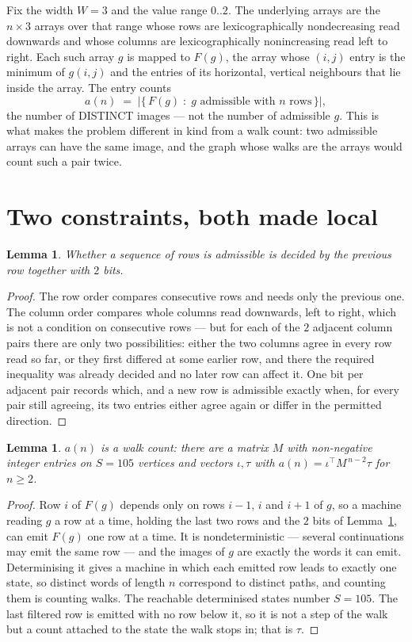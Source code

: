 \documentclass[11pt,a4paper]{article}
\theoremstyle{plain}
\newtheorem{lemma}[theorem]{Lemma}
\theoremstyle{definition}
\begin{document}
Fix the width $W=3$ and the value range $0..2$. The underlying arrays are the
$n\times3$ arrays over that range whose rows are lexicographically nondecreasing read downwards
and whose columns are lexicographically nonincreasing read left to right. Each such array $g$
is mapped to $F(g)$, the array whose $(i,j)$ entry is the minimum of $g(i,j)$ and the entries
of its horizontal, vertical neighbours that lie inside the array. The entry counts
\[
a(n)\;=\;\bigl|\{\,F(g)\;:\;g\text{ admissible with }n\text{ rows}\,\}\bigr|,
\]
the number of DISTINCT images --- not the number of admissible $g$. This is what makes the
problem different in kind from a walk count: two admissible arrays can have the same image, and
the graph whose walks are the arrays would count such a pair twice.

\section{Two constraints, both made local}

\begin{lemma}\label{lem:local}
Whether a sequence of rows is admissible is decided by the previous row together with
$2$ bits.
\end{lemma}

\begin{proof}
The row order compares consecutive rows and needs only the previous one. The column order
compares whole columns read downwards, left to right, which is not a condition on consecutive
rows --- but for each of the $2$ adjacent column pairs there are only two possibilities:
either the two columns agree in every row read so far, or they first differed at some earlier
row, and there the required inequality was already decided and no later row can affect it. One
bit per adjacent pair records which, and a new row is admissible exactly when, for every pair
still agreeing, its two entries either agree again or differ in the permitted direction.
\end{proof}

\begin{lemma}\label{lem:det}
$a(n)$ is a walk count: there are a matrix $M$ with non-negative integer entries on $S=105$
vertices and vectors $\iota,\tau$ with $a(n)=\iota^{\!\top}M^{\,n-2}\tau$ for $n\ge2$.
\end{lemma}

\begin{proof}
Row $i$ of $F(g)$ depends only on rows $i-1$, $i$ and $i+1$ of $g$, so a machine reading $g$ a
row at a time, holding the last two rows and the $2$ bits of Lemma~\ref{lem:local}, can
emit $F(g)$ one row at a time. It is nondeterministic --- several continuations may emit the
same row --- and the images of $g$ are exactly the words it can emit. Determinising it gives a
machine in which each emitted row leads to exactly one state, so distinct words of length $n$
correspond to distinct paths, and counting them is counting walks. The reachable determinised
states number $S=105$. The last filtered row is emitted with no row below it, so it is not a
step of the walk but a count attached to the state the walk stops in; that is $\tau$.
\end{proof}
\end{document}
